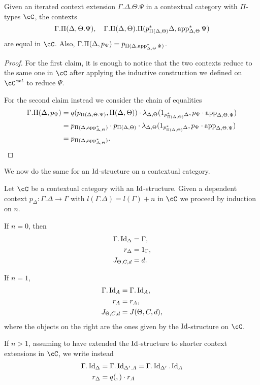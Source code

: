 \documentclass[a4paper,fontsize=12pt]{scrartcl}
\begin{document}
\begin{lem}
  Given an iterated context extension $\Gamma.\Delta.\Theta.\Psi$ in a
  contextual category with $\Pi$-types $\cC$, the contexts
  \[\Gamma.\Pi(\Delta,\Theta.\Psi),\quad\Gamma.\Pi(\Delta,\Theta).\Pi(p^*_{\Pi(\Delta,\Theta)}\Delta,\operatorname{app}^*_{\Delta,\Theta}\Psi)\]
  are equal in $\cC$. Also,
  $\Gamma.\Pi(\Delta,p_{\Psi})=p_{\Pi(\Delta,\operatorname{app}^*_{\Delta,\Theta}\Psi)}$.
\end{lem}
\begin{proof}
  For the first claim, it is enough to notice that the two contexts reduce to
  the same one in $\cC$ after applying the inductive construction we defined on
  $\cC^{cxt}$ to reduce $\Psi$.

  For the second claim instead we consider the chain of equalities
  \begin{align*}
    \Gamma.\Pi(\Delta,p_{\Psi})
    &=q(p_{\Pi(\Delta,\Theta.\Psi)},\Pi(\Delta,\Theta))\cdot
    \lambda_{\Delta,\Theta}(1_{p^*_{\Pi(\Delta,\Theta)}\Delta},p_\Psi\cdot\operatorname{app}_{\Delta,\Theta.\Psi}) \\
    &=p_{\Pi(\Delta,\operatorname{app}^*_{\Delta,\Theta})}\cdot
    p_{\Pi(\Delta,\Theta)}\cdot
    \lambda_{\Delta,\Theta}(1_{p^*_{\Pi(\Delta,\Theta)}\Delta},p_\Psi\cdot\operatorname{app}_{\Delta,\Theta.\Psi}) \\
    &=p_{\Pi(\Delta,\operatorname{app}^*_{\Delta,\Theta})}.
  \end{align*}
\end{proof}

We now do the same for an $\operatorname{Id}$-structure on a contextual category.

\begin{construction}
  Let $\cC$ be a contextual category with an $\operatorname{Id}$-structure. Given a dependent
  context $p_\Delta\colon\Gamma.\Delta\rightarrow\Gamma$ with
  $l(\Gamma.\Delta)=l(\Gamma)+n$ in $\cC$ we proceed by induction on $n$.

  If $n=0$, then
  \begin{align*}
    \Gamma.\operatorname{Id}_\Delta &=\Gamma, \\
    r_\Delta &=1_\Gamma, \\
    J_{\Theta,C,d} &=d.
  \end{align*}

  If $n=1$,
  \begin{align*}
    \Gamma.\operatorname{Id}_A &=\Gamma.\operatorname{Id}_A, \\
    r_A &=r_A, \\
    J_{\Theta,C,d} &=J(\Theta,C,d),
  \end{align*}
  where the objects on the right are the ones given by the $\operatorname{Id}$-structure on
  $\cC$.

  If $n>1$, assuming to have extended the $\operatorname{Id}$-structure to shorter context
  extensions in $\cC$, we write instead
  \begin{align*}
    \Gamma.\operatorname{Id}_{\Delta} &=\Gamma.\operatorname{Id}_{\Delta'.A}=\Gamma.\operatorname{Id}_{\Delta'}.\operatorname{Id}_A \\
    r_{\Delta} &= q(,)\cdot r_A
  \end{align*}
\end{construction}
\end{document}
